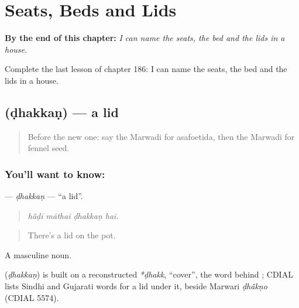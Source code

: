 
\chapter{Seats, Beds and Lids}
\label{ch:mw-seats-beds-and-lids}

\begin{chapteropening}
\textbf{By the end of this chapter:} \emph{I can name the seats, the bed and the lids in a house.}

Complete the last lesson of chapter 186: I can name the seats, the bed and the lids in a house.
\end{chapteropening}

\section[\texorpdfstring{\mw{ढक्कण} (ḍhakkaṇ)}{ढक्कण (ḍhakkaṇ)}]{ (ḍhakkaṇ) — a lid}

\label{lesson:MW-C186-dhakkan}



\begin{quote}
Before the new one: say the Marwadi for asafoetida, then the Marwadi for fennel seed.
\end{quote}

\subsection*{You'll want to know: }
\textbf{} — \emph{ḍhakkaṇ} — \textquotedblleft{}a lid\textquotedblright{}.

\begin{quote}
   
\end{quote}

\begin{quote}
\emph{hā̃ḍī māthai ḍhakkaṇ hai.}
\end{quote}

\begin{quote}
There's a lid on the pot.
\end{quote}

A masculine noun.

\begin{cousinweb}
\textbf{} (\emph{ḍhakkaṇ}) is built on a reconstructed \emph{*ḍhakk}, \textquotedblleft{}cover\textquotedblright{}, the word behind \textbf{}; CDIAL lists Sindhi and Gujarati words for a lid under it, beside Marwari \emph{ḍhā̃kṇo} (CDIAL 5574).
\end{cousinweb}

